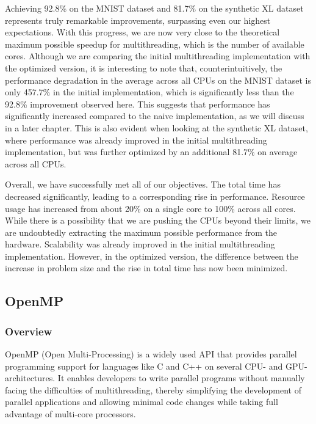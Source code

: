 \documentclass[modern,longauthor]{aastex7}
\begin{document}
Achieving 92.8\% on the MNIST dataset and 81.7\% on the synthetic XL dataset represents truly remarkable improvements, surpassing even our highest expectations. With this progress, we are now very close to the theoretical maximum possible speedup for multithreading, which is the number of available cores. Although we are comparing the initial multithreading implementation with the optimized version, it is interesting to note that, counterintuitively, the performance degradation in the average across all CPUs on the MNIST dataset is only 457.7\% in the initial implementation, which is significantly less than the 92.8\% improvement observed here. This suggests that performance has significantly increased compared to the naive implementation, as we will discuss in a later chapter. This is also evident when looking at the synthetic XL dataset, where performance was already improved in the initial multithreading implementation, but was further optimized by an additional 81.7\% on average across all CPUs.

Overall, we have successfully met all of our objectives. The total time has decreased significantly, leading to a corresponding rise in performance. Resource usage has increased from about 20\% on a single core to 100\% across all cores. While there is a possibility that we are pushing the CPUs beyond their limits, we are undoubtedly extracting the maximum possible performance from the hardware. Scalability was already improved in the initial multithreading implementation. However, in the optimized version, the difference between the increase in problem size and the rise in total time has now been minimized.
\subsection{OpenMP}\label{sec:openmp}
\subsubsection{Overview}\label{sec:openmp_overview}
OpenMP (Open Multi-Processing) is a widely used API that provides parallel programming support for languages like C and C++ on several CPU- and GPU-architectures. It enables developers to write parallel programs without manually facing the difficulties of multithreading, thereby simplifying the development of parallel applications and allowing minimal code changes while taking full advantage of multi-core processors.
\end{document}
